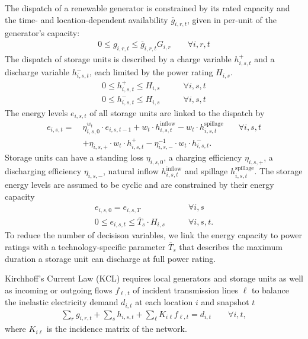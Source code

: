 The dispatch of a renewable generator is constrained by
its rated capacity and the time- and location-dependent availability $\overline{g}_{i,r,t}$,
given in per-unit of the generator's capacity:
\begin{align}
    0 \leq g_{i,r,t} \leq \overline{g}_{i,r,t} G_{i,r} \qquad\forall i, r, t
\end{align}
The dispatch of storage units is described by a charge variable $h_{i,s,t}^+$
and a discharge variable $h_{i,s,t}^-$, each limited by the power rating $H_{i,s}$.
\begin{align}
    0 \leq h_{i,s,t}^+ \leq H_{i,s} &\qquad\forall i, s, t \\
    0 \leq h_{i,s,t}^- \leq H_{i,s} &\qquad\forall i, s, t
\end{align}
The energy levels $e_{i,s,t}$ of all storage units are linked to the dispatch by
\begin{align}
    e_{i,s,t} =\: & \eta_{i,s,0}^{w_t} \cdot e_{i,s,t-1} + w_t \cdot h_{i,s,t}^\text{inflow} - w_t \cdot h_{i,s,t}^\text{spillage} & \quad\forall i, s, t \nonumber \\
    & + \eta_{i,s,+} \cdot w_t \cdot h_{i,s,t}^+ - \eta_{i,s,-}^{-1} \cdot w_t \cdot h_{i,s,t}^-.
\end{align}
Storage units can have a standing loss $\eta_{i,s,0}$, a charging efficiency $\eta_{i,s,+}$, a discharging efficiency $\eta_{i,s,-}$,
natural inflow $h_{i,s,t}^\text{inflow}$ and spillage $h_{i,s,t}^\text{spillage}$.
The storage energy levels are assumed to be cyclic and are constrained by their energy capacity
\begin{align}
    e_{i,s,0} = e_{i,s,T} &\qquad\forall i, s \\
    0 \leq e_{i,s,t} \leq \overline{T}_s \cdot H_{i,s} &\qquad\forall i, s, t.
\end{align}
To reduce the number of decisison variables, we link the energy capacity to
power ratings with a technology-specific parameter $\overline{T}_s$
that describes the maximum duration a storage unit can discharge at full power rating.

Kirchhoff's Current Law (KCL) requires local generators and storage units as well as
incoming or outgoing flows $f_{\ell,t}$ of incident transmission lines $\ell$
to balance the inelastic electricity demand $d_{i,t}$ at each location $i$ and snapshot $t$
\begin{align}
    \sum_r g_{i,r,t} + \sum_s h_{i,s,t} + \sum_\ell K_{i\ell} f_{\ell,t} = d_{i,t} \qquad\forall i,t,
\end{align}
where $K_{i\ell}$ is the incidence matrix of the network.

